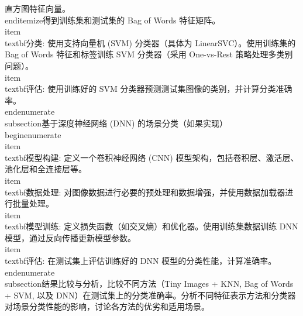 直方图特征向量。\n    \\end{itemize}\n    得到训练集和测试集的 Bag of Words 特征矩阵。\n    \\item \\textbf{分类:} 使用支持向量机 (SVM) 分类器（具体为 LinearSVC）。使用训练集的 Bag of Words 特征和标签训练 SVM 分类器（采用 One-vs-Rest 策略处理多类别问题）。\n    \\item \\textbf{评估:} 使用训练好的 SVM 分类器预测测试集图像的类别，并计算分类准确率。\n\\end{enumerate}\n\n\\subsection{基于深度神经网络 (DNN) 的场景分类（如果实现）}\n\n\\begin{enumerate}\n    \\item \\textbf{模型构建:} 定义一个卷积神经网络 (CNN) 模型架构，包括卷积层、激活层、池化层和全连接层等。\n    \\item \\textbf{数据处理:} 对图像数据进行必要的预处理和数据增强，并使用数据加载器进行批量处理。\n    \\item \\textbf{模型训练:} 定义损失函数（如交叉熵）和优化器。使用训练集数据训练 DNN 模型，通过反向传播更新模型参数。\n    \\item \\textbf{评估:} 在测试集上评估训练好的 DNN 模型的分类性能，计算准确率。\n\\end{enumerate}\n\n\\subsection{结果比较与分析}\n{}，比较不同方法（Tiny Images + KNN, Bag of Words + SVM, 以及 DNN）在测试集上的分类准确率。分析不同特征表示方法和分类器对场景分类性能的影响，讨论各方法的优劣和适用场景。 